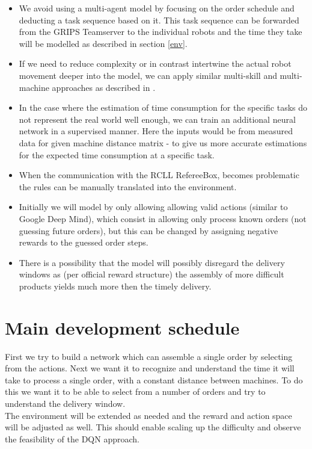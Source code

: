 \documentclass[runningheads,envcountsect]{llncs}
\begin{document}
\begin{itemize}
  \item We avoid using a multi-agent model by focusing on the order schedule and deducting a task sequence based on it. This task sequence can be forwarded from the GRIPS Teamserver to the individual robots and the time they take will be modelled as described in section \ref{env}.
  \item If we need to reduce complexity or in contrast intertwine the actual robot movement deeper into the model, we can apply similar multi-skill and multi-machine approaches as described in \cite{qu2016optimized}.
  \item In the case where the estimation of time consumption for the specific tasks do not represent the real world well enough, we can train an additional neural network in a supervised manner. Here the inputs would be from measured data for given machine distance matrix - to give us more accurate estimations for the expected time consumption at a specific task.
  \item When the communication with the RCLL RefereeBox, becomes problematic the rules can be manually translated into the environment.
  \item Initially we will model by only allowing allowing valid actions (similar to Google Deep Mind), which consist in allowing only process known orders (not guessing future orders), but this can be changed by assigning negative rewards to the guessed order steps.
  \item There is a possibility that the model will possibly disregard the delivery windows as (per official reward structure) the assembly of more difficult products yields much more then the timely delivery.
\end{itemize}


\section{Main development schedule}
First we try to build a network which can assemble a single order by selecting from the actions. Next we want it to recognize and understand the time it will take to process a single order, with a constant distance between machines. To do this we want it to be able to select from a number of orders and try to understand the delivery window.\\
The environment will be extended as needed and the reward and action space will be adjusted as well. This should enable scaling up the difficulty and observe the feasibility of the DQN approach.


\vspace{24pt}



\end{document}
